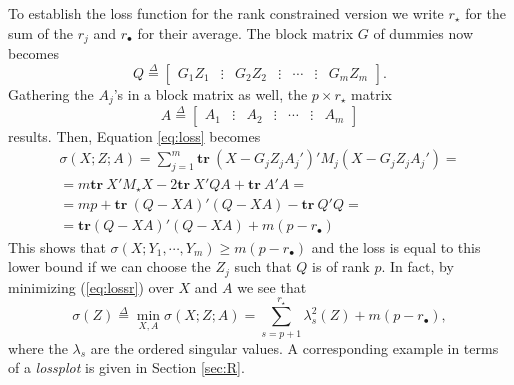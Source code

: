 \documentclass[article]{jss1}
\newcommand{\defi}{\mathop{=}\limits^{\Delta}}
\begin{document}
To establish the loss function for the rank constrained version we write $r_\star$ for the sum of the $r_j$ and $r_\bullet$ for their average. The block matrix $G$ of dummies now becomes 
\begin{equation}
Q\defi\begin{bmatrix}G_1Z_1&\vdots&G_2Z_2&\vdots&\cdots&\vdots&G_mZ_m\end{bmatrix}.
\end{equation}
Gathering the $A_j$'s in a block matrix as well, the $p \times r_\star$ matrix
\begin{equation}
A\defi\begin{bmatrix}A_1&\vdots&A_2&\vdots&\cdots&\vdots&A_m\end{bmatrix}
\end{equation}
results. Then, Equation \ref{eq:loss} becomes
\begin{eqnarray}
\label{eq:lossr}
\sigma(X;Z;A)=\sum_{j=1}^m\mathbf{tr}\ (X-G_jZ_jA_j')'M_j(X-G_jZ_jA_j')=\nonumber \\
=m\mathbf{tr}\ X'M_\star X-2\mathbf{tr}\ X'QA+\mathbf{tr}\ A'A=\nonumber \\
=mp+\mathbf{tr}\ (Q-XA)'(Q-XA)-\mathbf{tr}\ Q'Q=\nonumber \\
=\mathbf{tr}(Q-XA)'(Q-XA)+m(p-r_\bullet) 
\end{eqnarray}
This shows that $\sigma(X;Y_1,\cdots,Y_m)\geq m(p-r_\bullet)$ and the loss is equal to
this lower bound if we can choose the $Z_j$ such that $Q$ is of rank $p$. In fact, by
minimizing (\ref{eq:lossr}) over $X$ and $A$ we see that
\begin{equation}
\sigma(Z)\defi\min_{X,A}\sigma(X;Z;A)=
\sum_{s=p+1}^{r_\star}\lambda_s^2(Z)+m(p-r_\bullet),
\end{equation}
where the $\lambda_s$ are the ordered singular values. A corresponding example in terms of a \emph{lossplot} is given in Section \ref{sec:R}.
\end{document}
